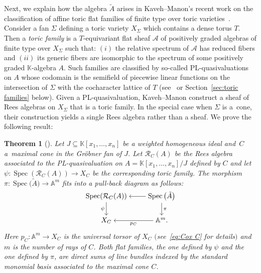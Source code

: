 \documentclass[pdftex]{sigma}%
\newtheorem{Theorem}{Theorem}[section]
\numberwithin{equation}{section}
\begin{document}
Next, we explain how the algebra $\tilde{A} $ arises in Kaveh--Manon's recent work on the classification of affine toric flat families of finite type over toric varieties~\cite{KM-toricbundles}.
Consider a fan $\Sigma$ defining a toric variety $X_\Sigma$ which contains a dense torus $T$.
Then a {\it toric family} is a $T$-equivariant flat sheaf $\mathcal A$ of positively graded algebras of finite type over $X_\Sigma$ such that: $(i)$ the relative spectrum of $\mathcal A$ has reduced fibers and $(ii)$ its generic fibers are isomorphic to the spectrum of some positively graded $\mathbb K$-algebra $A$.
Such families are classified by so-called PL-quasivaluations on $A$ whose codomain is the semifield of piecewise linear functions on the intersection of $\Sigma$ with the cocharacter lattice of $T$ (see~\cite[Section~1.1]{KM-toricbundles} or Section~\ref{sec:toric families} below).
Given a PL-quasivaluation, Kaveh--Manon construct a sheaf of Rees algebras on $X_\Sigma$ that is a toric family.
In the special case when $\Sigma$ is a~cone, their construction yields a single Rees algebra rather than a sheaf.
We prove the following result:

\begin{Theorem}[]
Let $J\subseteq\mathbb K[{x_1,\dots,x_n}]$ be a weighted homogeneous ideal and~$C$ a~maximal cone in the Gr\"obner fan of $J$.
Let $\mathcal R_C(A)$ be the Rees algebra associated to the PL-quasivaluation on $A=\mathbb K[{x_1,\dots,x_n}]/J$ defined by $C$ and let $\psi\colon \operatorname{Spec}(\mathcal R_C(A))\to X_C$ be the corresponding toric family.
The morphism $\pi\colon \operatorname{Spec}\big(\tilde A\big)\to \mathbb A^m$ fits into a pull-back diagram as follows:
 \begin{displaymath}
 \begin{tikzcd}[ampersand replacement=\&,cramped]
 \operatorname{Spec}(\mathcal R_C (A))\ar[d,"\psi"'] \&
 \operatorname{Spec}\big(\tilde A\big)\ar[d,"\pi"] \ar[l]\\
 X_{C}\& \mathbb A^m. \ar[l,"p_C"]
 \end{tikzcd}
 \end{displaymath}
Here $p_C\colon \mathbb A^m\to X_C$ is the universal torsor of $X_C$ $($see~\eqref{eq:Cox C} for details$)$ and $m$ is the number of rays of $C$.
Both flat families, the one defined by $\psi$ and the one defined by $\pi$, are direct sums of line bundles indexed by the standard monomial basis associated to the maximal cone $C$.
\end{Theorem}
\end{document}

